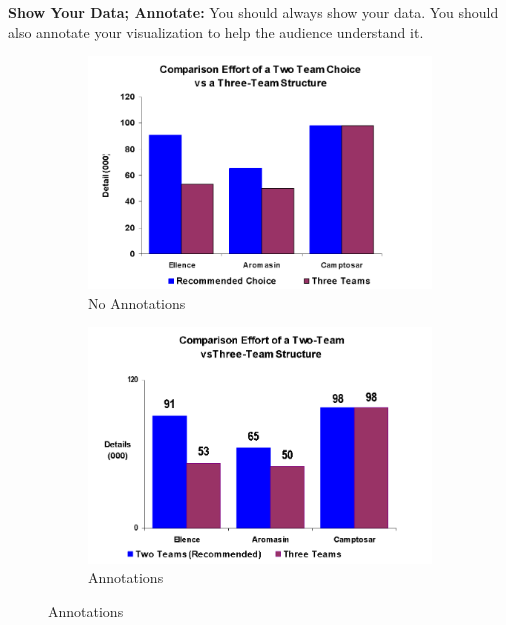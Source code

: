 \documentclass[11pt,fleqn]{book} %
\begin{document}
\begin{example}
  \textbf{Show Your Data; Annotate:}
  You should always show your data. You should also annotate
  your visualization to help the audience understand it.

  \begin{figure}[htb!]
    \centering
    \begin{subfigure}[c]{0.45\linewidth}
        \includegraphics[width=\linewidth]{Pictures/annotate1.png}
        \caption{No Annotations}
        \label{fig:annotate1}
    \end{subfigure}
    \hfill
    \begin{subfigure}[c]{0.45\linewidth}
        \includegraphics[width=\linewidth]{Pictures/annotate2.png}
        \caption{Annotations}
        \label{fig:annotate2}
    \end{subfigure}
  \end{figure}
\end{example}
\end{document}
